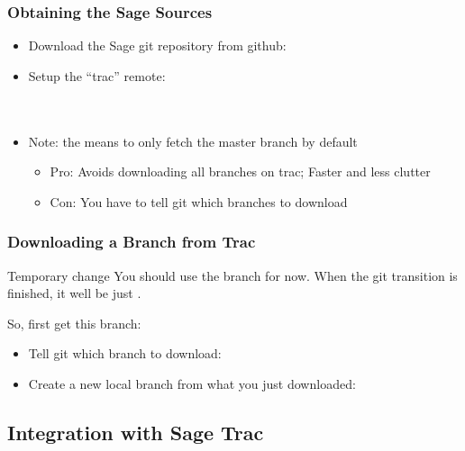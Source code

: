 \begin{frame}
  \frametitle{Obtaining the Sage Sources}
  
  \begin{itemize}
  \item<1->
    Download the Sage git repository from github:\\
  \item<2->
    Setup the ``trac'' remote:\\
    {
      \\
      \\
      \hfill
    }
  \item<3-> Note: the  means to only fetch the master
    branch by default 
    \begin{itemize}
    \item<4-> Pro: Avoids downloading all branches on trac; Faster and
      less clutter
    \item<5-> Con: You have to tell git which branches to download
    \end{itemize}
  \end{itemize}
\end{frame}




\begin{frame}
  \frametitle{Downloading a Branch from Trac}

   \begin{alertblock}{Temporary change}
     You should use the  branch for
     now. When the git transition is finished, it well be just
     .
   \end{alertblock}
   
   So, first get this branch:
   \begin{itemize}
   \item<1->
     Tell git which branch to download:\\
   \item<2->
     Create a new local branch from what you just downloaded:\\
   \end{itemize}
\end{frame}


\subsection{Integration with Sage Trac}


